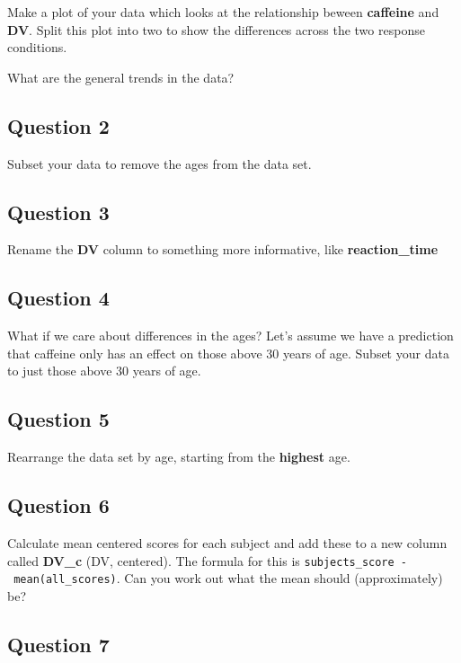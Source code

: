 \documentclass[
]{book}
\begin{document}
Make a plot of your data which looks at the relationship beween \textbf{caffeine} and \textbf{DV}. Split this plot into two to show the differences across the two response conditions.

What are the general trends in the data?

\hypertarget{question-2-4}{%
\subsection{Question 2}\label{question-2-4}}

Subset your data to remove the ages from the data set.

\hypertarget{question-3-4}{%
\subsection{Question 3}\label{question-3-4}}

Rename the \textbf{DV} column to something more informative, like \textbf{reaction\_time}

\hypertarget{question-4-4}{%
\subsection{Question 4}\label{question-4-4}}

What if we care about differences in the ages? Let's assume we have a prediction that caffeine only has an effect on those above 30 years of age. Subset your data to just those above 30 years of age.

\hypertarget{question-5-4}{%
\subsection{Question 5}\label{question-5-4}}

Rearrange the data set by age, starting from the \textbf{highest} age.

\hypertarget{question-6-4}{%
\subsection{Question 6}\label{question-6-4}}

Calculate mean centered scores for each subject and add these to a new column called \textbf{DV\_c} (DV, centered). The formula for this is \texttt{subjects\_score\ -\ mean(all\_scores)}. Can you work out what the mean should (approximately) be?

\hypertarget{question-7-4}{%
\subsection{Question 7}\label{question-7-4}}
\end{document}
